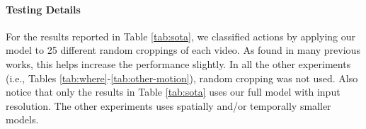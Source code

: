 \documentclass[10pt,twocolumn,letterpaper]{article}
\begin{document}
\paragraph{Testing Details} For the results reported in Table \ref{tab:sota}, we classified actions by applying our model to 25 different random croppings of each video. As found in many previous works, this helps increase the performance slightly. In all the other experiments (i.e., Tables \ref{tab:where}-\ref{tab:other-motion}), random cropping was not used. Also notice that only the results in Table \ref{tab:sota} uses our full model with  input resolution. The other experiments uses spatially and/or temporally smaller models.
\end{document}
